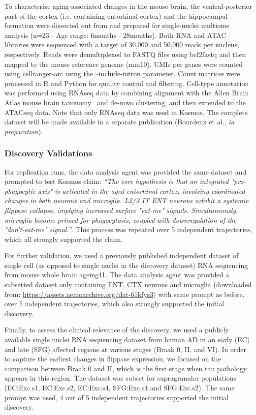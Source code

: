\documentclass{article}
\begin{document}
To characterize aging-associated changes in the mouse brain, the ventral-posterior part of the cortex (i.e. containing entorhinal cortex) and the hippocampal formation were dissected out from and prepared for single-nuclei multiome analysis (n=23 - Age range: 6months - 28months). Both RNA and ATAC libraries were sequenced with a target of 30,000 and 50,000 reads per nucleus, respectively. Reads were demultiplexed to FASTQ files using bcl2fastq and then mapped to the mouse reference genome (mm10). UMIs per genes were counted using cellranger-arc using the –include-intron parameter. Count matrices were processed in R and Python for quality control and filtering. Cell-type annotation was performed using RNAseq data by combining alignment with the Allen Brain Atlas mouse brain taxonomy~\cite{yao_high-resolution_2023} and de-novo clustering, and then extended to the ATACseq data. Note that only RNAseq data was used in Kosmos. The complete dataset will be made available in a separate publication (Bourdenx et al., \textit{in preparation}).


\subsubsection{Discovery Validations}

For replication runs, the data analysis agent was provided the same dataset and prompted to test Kosmos claim: \textit{“The core hypothesis is that an integrated "pro-phagocytic axis" is activated in the aged entorhinal cortex, involving coordinated changes in both neurons and microglia. L2/3 IT ENT neurons exhibit a systemic flippase collapse, implying increased surface "eat-me" signals. Simultaneously, microglia become primed for phagocytosis, coupled with downregulation of the "don't-eat-me" signal.”}. This process was repeated over 5 independent trajectories, which all strongly supported the claim.

For further validation, we used a previously published independent dataset of single cell (as opposed to single nuclei in the discovery dataset) RNA sequencing from mouse whole brain ageing41. The data analysis agent was provided a subsetted dataset only containing ENT, CTX neurons and microglia (downloaded from: \url{https://assets.nemoarchive.org/dat-61kfys3}) with same prompt as before, over 5 independent trajectories, which also strongly supported the initial discovery.

Finally, to assess the clinical relevance of the discovery, we used a publicly available single nuclei RNA sequencing dataset from human AD in an early (EC) and late (SFG) affected regions at various stages (Braak 0, II, and VI). In order to capture the earliest changes in flippase expression, we focused on the comparison between Braak 0 and II, which is the first stage when tau pathology appears in this region. The dataset was subset for supragranular populations (EC:Exc.s1, EC:Exc.s2, EC:Exc.s4, SFG:Exc.s4 and SFG:Exc.s2). The same prompt was used, 4 out of 5 independent trajectories supported the initial discovery.
\end{document}
